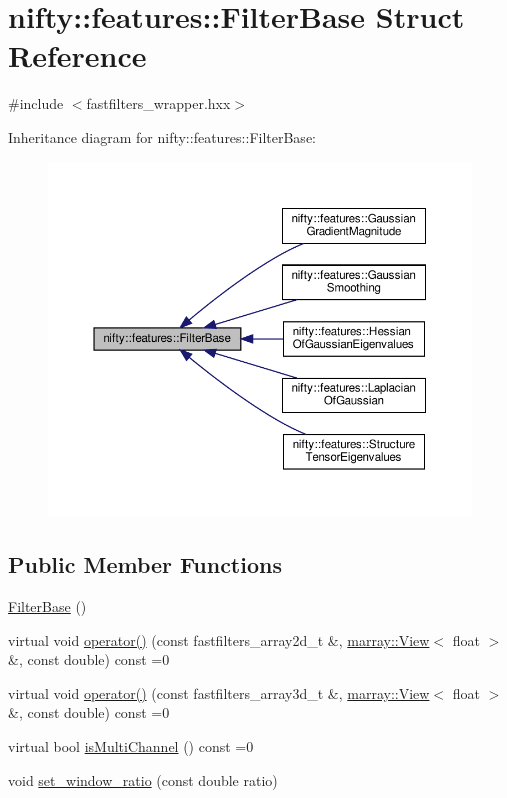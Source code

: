 \hypertarget{structnifty_1_1features_1_1FilterBase}{}\section{nifty\+:\+:features\+:\+:Filter\+Base Struct Reference}
\label{structnifty_1_1features_1_1FilterBase}


{\ttfamily \#include $<$fastfilters\+\_\+wrapper.\+hxx$>$}



Inheritance diagram for nifty\+:\+:features\+:\+:Filter\+Base\+:
\nopagebreak
\begin{figure}[H]
\begin{center}
\leavevmode
\includegraphics[width=350pt]{structnifty_1_1features_1_1FilterBase__inherit__graph}
\end{center}
\end{figure}
\subsection*{Public Member Functions}
\begin{DoxyCompactItemize}
\item 
\hyperlink{structnifty_1_1features_1_1FilterBase_ac10b9d69df645dd2feb7ce555e544502}{Filter\+Base} ()
\item 
virtual void \hyperlink{structnifty_1_1features_1_1FilterBase_a17c77d36dd765c5ec0b163102428656c}{operator()} (const fastfilters\+\_\+array2d\+\_\+t \&, \hyperlink{classandres_1_1View}{marray\+::\+View}$<$ float $>$ \&, const double) const =0
\item 
virtual void \hyperlink{structnifty_1_1features_1_1FilterBase_abbef4e9c260026926e0021aa0cc11c81}{operator()} (const fastfilters\+\_\+array3d\+\_\+t \&, \hyperlink{classandres_1_1View}{marray\+::\+View}$<$ float $>$ \&, const double) const =0
\item 
virtual bool \hyperlink{structnifty_1_1features_1_1FilterBase_a1c278e2b6ef0cb2a5bba2f758c6855e2}{is\+Multi\+Channel} () const =0
\item 
void \hyperlink{structnifty_1_1features_1_1FilterBase_ab59d743ba07608b8aaa37e59f049431e}{set\+\_\+window\+\_\+ratio} (const double ratio)
\end{DoxyCompactItemize}
